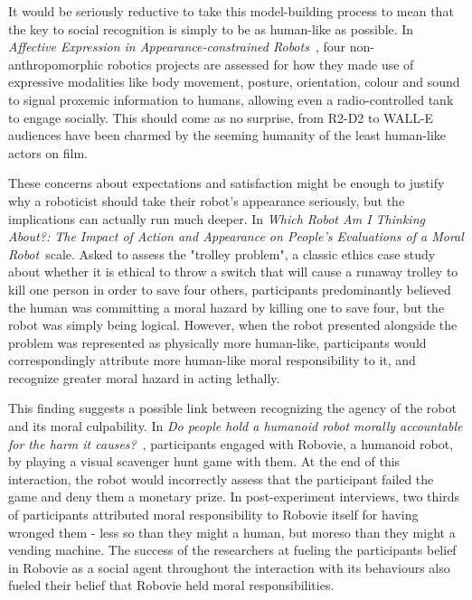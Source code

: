 \documentclass{sfuthesis}
\begin{document}
It would be seriously reductive to take this model-building process to mean that the key to social recognition is simply to be as human-like as possible. In \textit{Affective Expression in Appearance-constrained Robots}~\cite{bethel2006affective}, four non-anthropomorphic robotics projects are assessed for how they made use of expressive modalities like body movement, posture, orientation, colour and sound to signal proxemic information to humans, allowing even a radio-controlled tank to engage socially. This should come as no surprise, from R2-D2 to WALL-E audiences have been charmed by the seeming humanity of the least human-like actors on film.

These concerns about expectations and satisfaction might be enough to justify why a roboticist should take their robot's appearance seriously, but the implications can actually run much deeper. In \textit{Which Robot Am I Thinking About?: The Impact of Action and Appearance on People's Evaluations of a Moral Robot}~\cite{malle2016robot}scale. Asked to assess the "trolley problem", a classic ethics case study about whether it is ethical to throw a switch that will cause a runaway trolley to kill one person in order to save four others, participants predominantly believed the human was committing a moral hazard by killing one to save four, but the robot was simply being logical. However, when the robot presented alongside the problem was represented as physically more human-like, participants would correspondingly attribute more human-like moral responsibility to it, and recognize greater moral hazard in acting lethally.

This finding suggests a possible link between recognizing the agency of the robot and its moral culpability. In \textit{Do people hold a humanoid robot morally accountable for the harm it causes?}~\cite{kahn2012people}, participants engaged with Robovie, a humanoid robot, by playing a visual scavenger hunt game with them. At the end of this interaction, the robot would incorrectly assess that the participant failed the game and deny them a monetary prize. In post-experiment interviews, two thirds of participants attributed moral responsibility to Robovie itself for having wronged them - less so than they might a human, but moreso than they might a vending machine. The success of the researchers at fueling the participants belief in Robovie as a social agent throughout the interaction with its behaviours also fueled their belief that Robovie held moral responsibilities.
\end{document}
